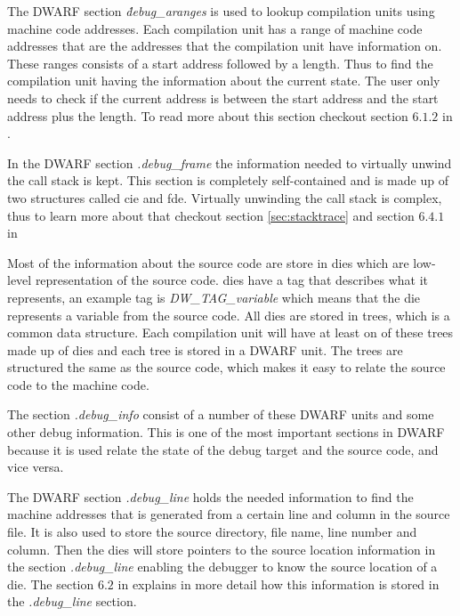 The \gls{DWARF} section \emph{\.debug\_aranges} is used to lookup compilation units using machine code addresses.
Each compilation unit has a range of machine code addresses that are the addresses that the compilation unit have information on.
These ranges consists of a start address followed by a length.
Thus to find the compilation unit having the information about the current state.
The user only needs to check if the current address is between the start address and the start address plus the length.
To read more about this section checkout section $6.1.2$ in \cite{dwarf}.


In the \gls{DWARF} section \emph{.debug\_frame} the information needed to virtually unwind the call stack is kept.
This section is completely self-contained and is made up of two structures called \acrfull{cie} and \acrfull{fde}.
Virtually unwinding the call stack is complex, thus to learn more about that checkout section \ref{sec:stacktrace} and  section $6.4.1$ in \cite{dwarf}


Most of the information about the source code are store in \glspl{die} which are low-level representation of the source code.
\glspl{die} have a tag that describes what it represents, an example tag is \emph{DW\_TAG\_variable} which means that the \gls{die} represents a variable from the source code.
All \glspl{die} are stored in trees, which is a common data structure.
Each compilation unit will have at least on of these trees made up of \glspl{die} and each tree is stored in a \gls{DWARF} unit.
The trees are structured the same as the source code, which makes it easy to relate the source code to the machine code.

The section \emph{.debug\_info} consist of a number of these \gls{DWARF} units and some other debug information.
This is one of the most important sections in \gls{DWARF} because it is used relate the state of the debug target and the source code, and vice versa.


The \gls{DWARF} section \emph{.debug\_line} holds the needed information to find the machine addresses that is generated from a certain line and column in the source file.
It is also used to store the source directory, file name, line number and column.
Then the \glspl{die} will store pointers to the source location information in the section \emph{.debug\_line} enabling the debugger to know the source location of a \gls{die}.
The section $6.2$ in \cite{dwarf} explains in more detail how this information is stored in the \emph{.debug\_line} section.


